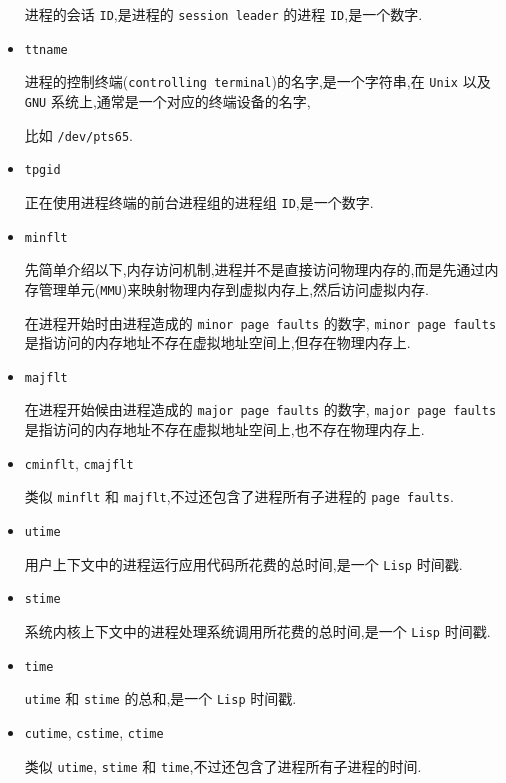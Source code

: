 \documentclass[11pt]{article}
\begin{document}
\begin{itemize}
进程的会话 \texttt{ID},是进程的 \texttt{session leader} 的进程 \texttt{ID},是一个数字.

\item \texttt{ttname}

进程的控制终端(\texttt{controlling terminal})的名字,是一个字符串,在 \texttt{Unix} 以及 \texttt{GNU} 系统上,通常是一个对应的终端设备的名字,

比如 \texttt{/dev/pts65}.

\item \texttt{tpgid}

正在使用进程终端的前台进程组的进程组 \texttt{ID},是一个数字.

\item \texttt{minflt}

先简单介绍以下,内存访问机制,进程并不是直接访问物理内存的,而是先通过内存管理单元(\texttt{MMU})来映射物理内存到虚拟内存上,然后访问虚拟内存.

在进程开始时由进程造成的 \texttt{minor page faults} 的数字, \texttt{minor page faults} 是指访问的内存地址不存在虚拟地址空间上,但存在物理内存上.

\item \texttt{majflt}

在进程开始候由进程造成的 \texttt{major page faults} 的数字, \texttt{major page faults} 是指访问的内存地址不存在虚拟地址空间上,也不存在物理内存上.

\item \texttt{cminflt}, \texttt{cmajflt}

类似 \texttt{minflt} 和 \texttt{majflt},不过还包含了进程所有子进程的 \texttt{page faults}.

\item \texttt{utime}

用户上下文中的进程运行应用代码所花费的总时间,是一个 \texttt{Lisp} 时间戳.

\item \texttt{stime}

系统内核上下文中的进程处理系统调用所花费的总时间,是一个 \texttt{Lisp} 时间戳.

\item \texttt{time}

\texttt{utime} 和 \texttt{stime} 的总和,是一个 \texttt{Lisp} 时间戳.

\item \texttt{cutime}, \texttt{cstime}, \texttt{ctime}

类似 \texttt{utime}, \texttt{stime} 和 \texttt{time},不过还包含了进程所有子进程的时间.


\end{itemize}
\end{document}
